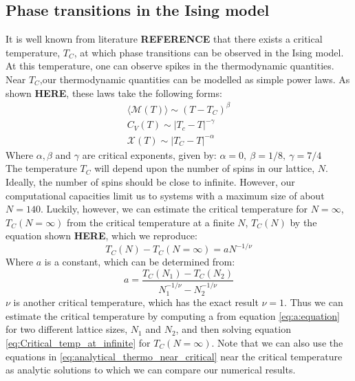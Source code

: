 \documentclass[a4paper, 10pt]{article}
\begin{document}
\subsection{Phase transitions in the Ising model}\label{phase_tranisition}
It is well known from literature \textbf{REFERENCE} that there exists a critical temperature, $T_C$, at which phase transitions can be observed in the Ising model. At this temperature, one can observe spikes in the thermodynamic quantities. Near $T_C$,our thermodynamic quantities can be modelled as simple power laws. As shown \textbf{HERE}, these laws take the following forms:
\begin{equation}\label{eq:analytical_thermo_near_critical}
\begin{split}
\langle \mathcal{M}(T)\rangle \sim (T-T_C)^{\beta}\\
C_V(T) \sim |T_c-T|^{-\gamma}\\
\mathcal{X}(T) \sim |T_C-T|^{-\alpha}
\end{split}
\end{equation}
Where $\alpha, \beta$ and $\gamma$ are critical exponents, given by: $\alpha=0,\  \beta=1/8,\ \gamma=7/4$\\
\linebreak
The temperature $T_C$ will depend upon the number of spins in our lattice, $N$. Ideally, the number of spins should be close to infinite. However, our computational capacities limit us to systems with a maximum size of about $N=140$. Luckily, however, we can estimate the critical temperature for $N=\infty$, $T_C(N=\infty)$ from the critical temperature at a finite $N$, $T_C(N)$ by the equation shown \textbf{HERE}, which we reproduce:
\begin{equation}\label{eq:Critical_temp_at_infinite}
T_C(N)-T_C(N=\infty)=aN^{-1/\nu}
\end{equation}
Where $a$ is a constant, which can be determined from:
\begin{equation}\label{eq:a:equation}
a=\frac{T_C(N_1)-T_C(N_2)}{N_1^{-1/\nu}-N_2^{-1/\nu}}
\end{equation}
$\nu$ is another critical temperature, which has the exact result $\nu=1$. Thus we can estimate the critical temperature by computing a from equation \ref{eq:a:equation} for two different lattice sizes, $N_1$ and $N_2$, and then solving equation \ref{eq:Critical_temp_at_infinite} for $T_C(N=\infty)$. Note that we can also use the equations in \ref{eq:analytical_thermo_near_critical} near the critical temperature as analytic solutions to which we can compare our numerical results. 
\end{document}
